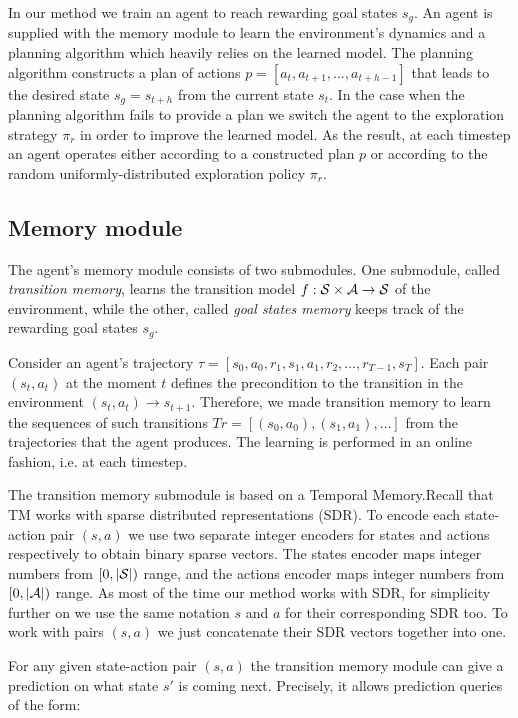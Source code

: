 \documentclass[runningheads]{llncs}
\begin{document}
In our method we train an agent to reach rewarding goal states $s_g$. An agent is supplied with the memory module to learn the environment's dynamics and a planning algorithm which heavily relies on the learned model. The planning algorithm constructs a plan of actions $p = [a_t, a_{t+1}, \dots, a_{t+h-1}]$ that leads to the desired state $s_g = s_{t+h}$ from the current state $s_t$. In the case when the planning algorithm fails to provide a plan we switch the agent to the exploration strategy $\pi_r$ in order to improve the learned model. As the result, at each timestep an agent operates either according to a constructed plan $p$ or according to the random uniformly-distributed exploration policy $\pi_r$.

\subsection{Memory module}

The agent's memory module consists of two submodules. One submodule, called \textit{transition memory}, learns the transition model $f: \mathcal{S} \times \mathcal{A} \rightarrow \mathcal{S}$ of the environment, while the other, called \textit{goal states memory} keeps track of the rewarding goal states $s_g$.

Consider an agent's trajectory $\tau = [s_0, a_0, r_1, s_1, a_1, r_2, \dots, r_{T-1}, s_T]$. Each pair $(s_t, a_t)$ at the moment $t$ defines the precondition to the transition in the environment $(s_t, a_t) \rightarrow s_{t+1}$. Therefore, we made transition memory to learn the sequences of such transitions $Tr = [(s_0, a_0), (s_1, a_1), \dots]$ from the trajectories that the agent produces. The learning is performed in an online fashion, i.e. at each timestep.

The transition memory submodule is based on a Temporal Memory.Recall that TM works with sparse distributed representations (SDR). To encode each state-action pair $(s, a)$ we use two separate integer encoders for states and actions respectively to obtain binary sparse vectors. The states encoder maps integer numbers from $[0, |\mathcal{S}|)$ range, and the actions encoder maps integer numbers from $[0, |\mathcal{A}|)$ range. As most of the time our method works with SDR, for simplicity further on we use the same notation $s$ and $a$ for their corresponding SDR too. To work with pairs $(s, a)$ we just concatenate their SDR vectors together into one.

For any given state-action pair $(s, a)$ the transition memory module can give a prediction on what state $s'$ is coming next.
Precisely, it allows prediction queries of the form:
\end{document}
